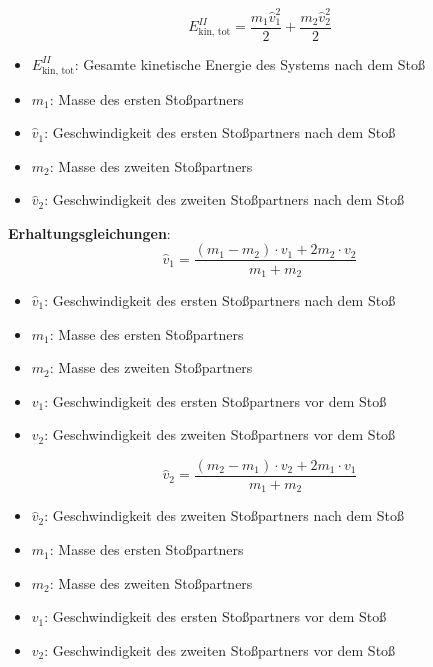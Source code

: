 \documentclass[a4paper, 8pt]{extarticle}
\begin{document}
\begin{landscape}
\begin{multicols*}{3}
\[
E_{\text{kin, tot}}^{II} = \frac{m_1 \hat{v}_1^2}{2} + \frac{m_2 \hat{v}_2^2}{2}
\]
{\footnotesize
\begin{itemize}
    \item \( E_{\text{kin, tot}}^{II} \): Gesamte kinetische Energie des Systems nach dem Stoß
    \item \( m_1 \): Masse des ersten Stoßpartners
    \item \( \hat{v}_1 \): Geschwindigkeit des ersten Stoßpartners nach dem Stoß
    \item \( m_2 \): Masse des zweiten Stoßpartners
    \item \( \hat{v}_2 \): Geschwindigkeit des zweiten Stoßpartners nach dem Stoß
\end{itemize}
}

\textbf{Erhaltungsgleichungen}:
\[
\hat{v}_1 = \frac{(m_1 - m_2) \cdot v_1 + 2 m_2 \cdot v_2}{m_1 + m_2}
\]
{\footnotesize
\begin{itemize}
    \item \( \hat{v}_1 \): Geschwindigkeit des ersten Stoßpartners nach dem Stoß
    \item \( m_1 \): Masse des ersten Stoßpartners
    \item \( m_2 \): Masse des zweiten Stoßpartners
    \item \( v_1 \): Geschwindigkeit des ersten Stoßpartners vor dem Stoß
    \item \( v_2 \): Geschwindigkeit des zweiten Stoßpartners vor dem Stoß
\end{itemize}
}

\[
\hat{v}_2 = \frac{(m_2 - m_1) \cdot v_2 + 2 m_1 \cdot v_1}{m_1 + m_2}
\]
{\footnotesize
\begin{itemize}
    \item \( \hat{v}_2 \): Geschwindigkeit des zweiten Stoßpartners nach dem Stoß
    \item \( m_1 \): Masse des ersten Stoßpartners
    \item \( m_2 \): Masse des zweiten Stoßpartners
    \item \( v_1 \): Geschwindigkeit des ersten Stoßpartners vor dem Stoß
    \item \( v_2 \): Geschwindigkeit des zweiten Stoßpartners vor dem Stoß
\end{itemize}
}


\end{multicols*}
\end{landscape}
\end{document}
